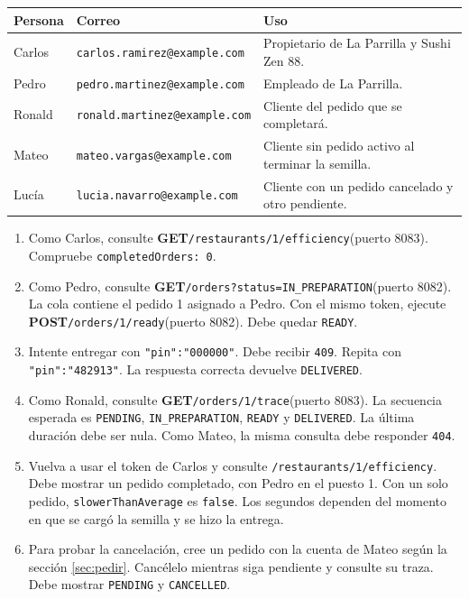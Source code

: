 \documentclass[11pt,a4paper]{article}
\newcommand{\code}[1]{\nolinkurl{#1}}
\newcommand{\route}[2]{\textbf{#1}\enspace\code{#2}}
\newcommand{\call}[3]{\route{#1}{#2}\enspace(puerto #3)}
\begin{document}
\begin{minipage}{\linewidth}
\begin{tabularx}{\linewidth}{@{}P{30mm}P{63mm}Y@{}}
\toprule
Persona & Correo & Uso \\
\midrule
Carlos & \code{carlos.ramirez@example.com} & Propietario de La Parrilla y Sushi Zen 88. \\
Pedro & \code{pedro.martinez@example.com} & Empleado de La Parrilla. \\
Ronald & \code{ronald.martinez@example.com} & Cliente del pedido que se completará. \\
Mateo & \code{mateo.vargas@example.com} & Cliente sin pedido activo al terminar la semilla. \\
Lucía & \code{lucia.navarro@example.com} & Cliente con un pedido cancelado y otro pendiente. \\
\bottomrule
\end{tabularx}
\end{minipage}

\begin{enumerate}
\item Como Carlos, consulte \call{GET}{/restaurants/1/efficiency}{8083}. Compruebe \code{completedOrders: 0}.
\item Como Pedro, consulte \call{GET}{/orders?status=IN_PREPARATION}{8082}. La cola contiene el pedido 1 asignado a Pedro. Con el mismo token, ejecute \call{POST}{/orders/1/ready}{8082}. Debe quedar \code{READY}.
\item Intente entregar con \code{"pin":"000000"}. Debe recibir \code{409}. Repita con \code{"pin":"482913"}. La respuesta correcta devuelve \code{DELIVERED}.
\item Como Ronald, consulte \call{GET}{/orders/1/trace}{8083}. La secuencia esperada es \code{PENDING}, \code{IN_PREPARATION}, \code{READY} y \code{DELIVERED}. La última duración debe ser nula. Como Mateo, la misma consulta debe responder \code{404}.
\item Vuelva a usar el token de Carlos y consulte \code{/restaurants/1/efficiency}. Debe mostrar un pedido completado, con Pedro en el puesto 1. Con un solo pedido, \code{slowerThanAverage} es \code{false}. Los segundos dependen del momento en que se cargó la semilla y se hizo la entrega.
\item Para probar la cancelación, cree un pedido con la cuenta de Mateo según la sección \ref{sec:pedir}. Cancélelo mientras siga pendiente y consulte su traza. Debe mostrar \code{PENDING} y \code{CANCELLED}.
\end{enumerate}
\end{document}
